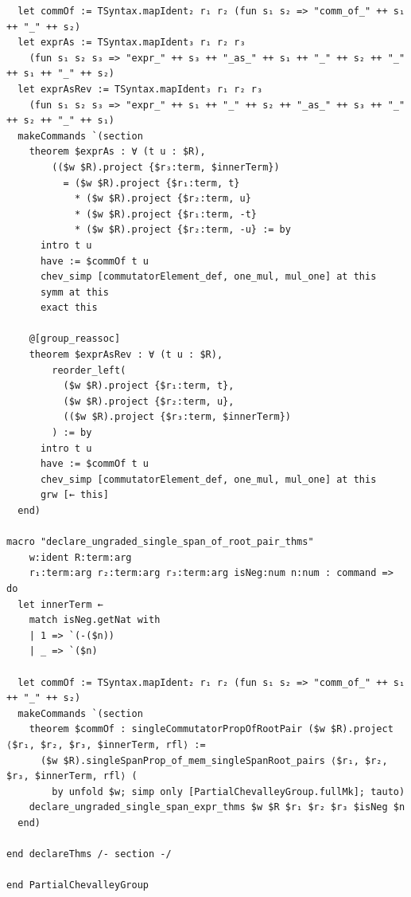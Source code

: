 \documentclass[10pt,a4paper]{article}
\begin{document}
\begin{Verbatim}
  let commOf := TSyntax.mapIdent₂ r₁ r₂ (fun s₁ s₂ => "comm_of_" ++ s₁ ++ "_" ++ s₂)
  let exprAs := TSyntax.mapIdent₃ r₁ r₂ r₃
    (fun s₁ s₂ s₃ => "expr_" ++ s₃ ++ "_as_" ++ s₁ ++ "_" ++ s₂ ++ "_" ++ s₁ ++ "_" ++ s₂)
  let exprAsRev := TSyntax.mapIdent₃ r₁ r₂ r₃
    (fun s₁ s₂ s₃ => "expr_" ++ s₁ ++ "_" ++ s₂ ++ "_as_" ++ s₃ ++ "_" ++ s₂ ++ "_" ++ s₁)
  makeCommands `(section
    theorem $exprAs : ∀ (t u : $R),
        (($w $R).project {$r₃:term, $innerTerm})
          = ($w $R).project {$r₁:term, t}
            * ($w $R).project {$r₂:term, u}
            * ($w $R).project {$r₁:term, -t}
            * ($w $R).project {$r₂:term, -u} := by
      intro t u
      have := $commOf t u
      chev_simp [commutatorElement_def, one_mul, mul_one] at this
      symm at this
      exact this

    @[group_reassoc]
    theorem $exprAsRev : ∀ (t u : $R),
        reorder_left(
          ($w $R).project {$r₁:term, t},
          ($w $R).project {$r₂:term, u},
          (($w $R).project {$r₃:term, $innerTerm})
        ) := by
      intro t u
      have := $commOf t u
      chev_simp [commutatorElement_def, one_mul, mul_one] at this
      grw [← this]
  end)

macro "declare_ungraded_single_span_of_root_pair_thms"
    w:ident R:term:arg
    r₁:term:arg r₂:term:arg r₃:term:arg isNeg:num n:num : command => do
  let innerTerm ←
    match isNeg.getNat with
    | 1 => `(-($n))
    | _ => `($n)

  let commOf := TSyntax.mapIdent₂ r₁ r₂ (fun s₁ s₂ => "comm_of_" ++ s₁ ++ "_" ++ s₂)
  makeCommands `(section
    theorem $commOf : singleCommutatorPropOfRootPair ($w $R).project ⟨$r₁, $r₂, $r₃, $innerTerm, rfl⟩ :=
      ($w $R).singleSpanProp_of_mem_singleSpanRoot_pairs ⟨$r₁, $r₂, $r₃, $innerTerm, rfl⟩ (
        by unfold $w; simp only [PartialChevalleyGroup.fullMk]; tauto)
    declare_ungraded_single_span_expr_thms $w $R $r₁ $r₂ $r₃ $isNeg $n
  end)

end declareThms /- section -/

end PartialChevalleyGroup
\end{Verbatim}
\end{document}
